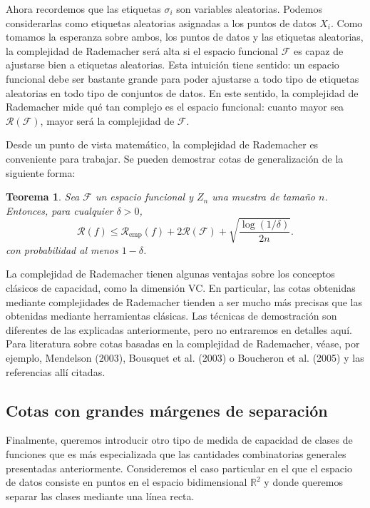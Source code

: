 \documentclass{article}
\newtheorem{thm}{Teorema}[subsection]
\begin{document}
Ahora recordemos que las etiquetas \(\sigma_i\) son variables aleatorias. Podemos considerarlas 
como etiquetas aleatorias asignadas a los puntos de datos \(X_i\). Como tomamos la esperanza sobre ambos, los 
puntos de datos y las etiquetas aleatorias, la complejidad de Rademacher será alta si el espacio funcional 
\(\mathcal{F}\) es capaz de ajustarse bien a etiquetas aleatorias. Esta intuición tiene sentido: un espacio 
funcional debe ser bastante grande para poder ajustarse a todo tipo de etiquetas aleatorias en todo tipo de 
conjuntos de datos. En este sentido, la complejidad de Rademacher mide qué tan complejo es el espacio 
funcional: cuanto mayor sea \(\mathscr{R}(\mathcal{F})\), mayor será la complejidad de \(\mathcal{F}\).\newline

Desde un punto de vista matemático, la complejidad de Rademacher es conveniente para trabajar. Se pueden 
demostrar cotas de generalización de la siguiente forma:
\begin{thm}
    Sea $\mathcal{F}$ un espacio funcional y $Z_n$ una muestra de tamaño $n$. Entonces, para cualquier $\delta > 0$,
\[
\mathcal{R}(f) \leq \mathcal{R}_{\text{emp}}(f) + 2\mathscr{R}(\mathcal{F}) + \sqrt{\frac{\log(1/\delta)}{2n}}.
\]
con probabilidad al menos \(1 - \delta\).\\
\end{thm}

La complejidad de Rademacher tienen algunas ventajas sobre los conceptos clásicos de capacidad, como la 
dimensión VC. En particular, las cotas obtenidas mediante complejidades de Rademacher tienden a ser mucho más 
precisas que las obtenidas mediante herramientas clásicas. Las técnicas de demostración son diferentes de las 
explicadas anteriormente, pero no entraremos en detalles aquí. Para literatura sobre cotas basadas en la 
complejidad de Rademacher, véase, por ejemplo, Mendelson (2003), Bousquet et al. (2003) o Boucheron et al. 
(2005) y las referencias allí citadas.

\subsection{Cotas con grandes márgenes de separación}

Finalmente, queremos introducir otro tipo de medida de capacidad de clases de funciones que es 
más especializada que las cantidades combinatorias generales presentadas anteriormente. Consideremos 
el caso particular en el que el espacio de datos consiste en puntos en el espacio bidimensional 
\(\mathbb{R}^2\) y donde queremos separar las clases mediante una línea recta. 
\end{document}
